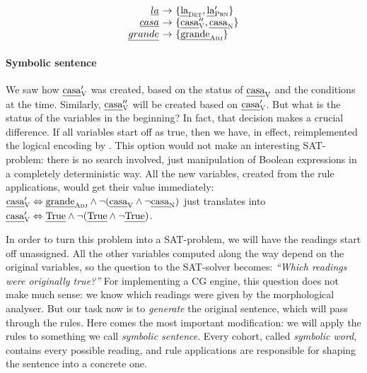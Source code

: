 $$\begin{array}{r @{~\rightarrow~} l}
\emph{la} & \{\laDet, \la{}'_\prn \} \\
\emph{casa} & \{\casa{}''_\v, \casaN \} \\
\emph{grande} & \{ \grandeAdj \} \\
\end{array}$$


\paragraph{Symbolic sentence}

We saw how $\text{\em casa}{}'_{\text{\sc V}}$ was created, based on the status of $\text{\em casa}_{\text{\sc V}}$ and the conditions at the time. Similarly, $\text{\em casa}{}''_{\text{\sc V}}$ will be created based on $\text{\em casa}{}'_{\text{\sc V}}$.
But what is the status of the variables in the beginning?
In fact, that decision makes a crucial difference. If all variables
start off as true, then we have, in effect, reimplemented the logical
encoding by \citet{lager_nivre01}.  This option would not make an
interesting SAT-problem: there is no search involved, just
manipulation of Boolean expressions in a completely deterministic way.
All the new variables, created from the rule applications, would get
their value immediately:
$\text{\em casa}{}'_{\text{\sc V}} \Leftrightarrow \text{\em grande}_{\text{\sc Adj}} \wedge \neg (\text{\em casa}_{\text{\sc V}} \wedge
\neg \text{\em casa}_{\text{\sc N}})$ just translates into
$\text{\em casa}{}'_{\text{\sc V}} \Leftrightarrow \text{\em True} \wedge \neg (\text{\em
  True} \wedge \neg \text{\em True})$.



In order to turn this problem into a SAT-problem, we will have the readings start off
unassigned. All the other variables computed along the way depend on the original variables, so the question to the SAT-solver becomes: \emph{``Which readings were originally true?''}
For implementing a CG engine, this question does not make much sense: we know which readings were given by the morphological analyser.
But our task now is to {\em generate} the original sentence, which will pass through the rules.
Here comes the most important modification: we will apply the rules to something we call {\em symbolic sentence}.
Every cohort, called {\em symbolic word}, contains every possible reading, and rule applications are responsible for shaping the sentence into a concrete one.

